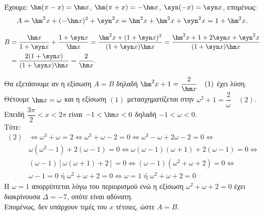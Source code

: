 \begin{alist}
\item Έχουμε: $\hm (\pi - x) = \hm  x$, $\hm (\pi + x) = -\hm  x$, $\syn (-x) = \syn  x$, επομένως:
\[A = \hm ^2 x + (-\hm  x)^2 + \syn ^2 x = \hm ^2 x + \hm ^2 x + \syn ^2 x = 1 + \hm ^2 x.\]
\item 
\begin{align*}
B &= \frac{\hm  x}{1 + \syn  x} + \frac{1 + \syn  x}{\hm  x} = \frac{\hm ^2 x + (1 + \syn  x)^2}{(1 + \syn  x)\hm  x} = \frac{\hm ^2 x + 1 + 2\syn  x + \syn ^2 x}{(1 + \syn  x)\hm  x} \\
&= \frac{2(1 + \syn  x)}{(1 + \syn  x)\hm  x} = \frac{2}{\hm  x}.
\end{align*}
\item Θα εξετάσουμε αν η εξίσωση $A = B$ δηλαδή $\hm ^2 x + 1 = \dfrac{2}{\hm  x} \quad (1)$ έχει λύση. \\
Θέτουμε $\hm  x = \omega$ και η εξίσωση $(1)$ μετασχηματίζεται στην $\omega^2 + 1 = \dfrac{2}{\omega} \quad (2)$. \\
Επειδή $\dfrac{3\pi}{2} < x < 2\pi$ είναι $-1 < \hm  x < 0$ δηλαδή $-1 < \omega < 0$. \\
Τότε: 
\begin{align*}
(2) &\Leftrightarrow \omega^3 + \omega = 2 \Leftrightarrow \omega^3 + \omega - 2 = 0 \Leftrightarrow \omega^3 - \omega + 2\omega - 2 = 0 \Leftrightarrow \\
&\omega(\omega^2 - 1) + 2(\omega - 1) = 0 \Leftrightarrow \omega(\omega - 1)(\omega + 1) + 2(\omega - 1) = 0 \Leftrightarrow \\
&(\omega - 1)[\omega(\omega + 1) + 2] = 0 \Leftrightarrow (\omega - 1)(\omega^2 + \omega + 2) = 0 \Leftrightarrow \\
&\omega - 1 = 0 \text{ ή } \omega^2 + \omega + 2 = 0 \Leftrightarrow \omega = 1 \text{ ή } \omega^2 + \omega + 2 = 0
\end{align*}
Η $\omega = 1$ απορρίπτεται λόγω του περιορισμού ενώ η εξίσωση $\omega^2 + \omega + 2 = 0$ έχει διακρίνουσα $\Delta = -7$, οπότε είναι αδύνατη. \\
Επομένως, δεν υπάρχουν τιμές του $x$ τέτοιες, ώστε $A = B$.
\end{alist}

